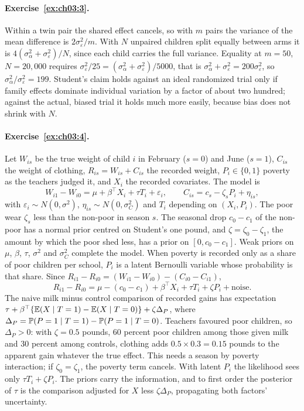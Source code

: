 \paragraph{Exercise~\ref{ex:ch03:3}.} Within a twin pair the shared effect cancels, so with $m$ pairs the variance of the mean difference is $2\sigma_\varepsilon^2/m$. With $N$ unpaired children split equally between arms it is $4(\sigma_\alpha^2 + \sigma_\varepsilon^2)/N$, since each child carries the full variance. Equality at $m = 50$, $N = 20{,}000$ requires $\sigma_\varepsilon^2/25 = (\sigma_\alpha^2 + \sigma_\varepsilon^2)/5000$, that is $\sigma_\alpha^2 + \sigma_\varepsilon^2 = 200\sigma_\varepsilon^2$, so $\sigma_\alpha^2/\sigma_\varepsilon^2 = 199$. Student's claim holds against an ideal randomized trial only if family effects dominate individual variation by a factor of about two hundred; against the actual, biased trial it holds much more easily, because bias does not shrink with $N$.

\paragraph{Exercise~\ref{ex:ch03:4}.} Let $W_{is}$ be the true weight of child $i$ in February ($s = 0$) and June ($s = 1$), $C_{is}$ the weight of clothing, $R_{is} = W_{is} + C_{is}$ the recorded weight, $P_i \in \{0, 1\}$ poverty as the teachers judged it, and $X_i$ the recorded covariates. The model is
\[
W_{i1} - W_{i0} = \mu + \beta^\top X_i + \tau T_i + \varepsilon_i, \qquad C_{is} = c_s - \zeta_s P_i + \eta_{is},
\]
with $\varepsilon_i \sim N(0, \sigma^2)$, $\eta_{is} \sim N(0, \sigma_C^2)$ and $T_i$ depending on $(X_i, P_i)$. The poor wear $\zeta_s$ less than the non-poor in season $s$. The seasonal drop $c_0 - c_1$ of the non-poor has a normal prior centred on Student's one pound, and $\zeta = \zeta_0 - \zeta_1$, the amount by which the poor shed less, has a prior on $[0, c_0 - c_1]$. Weak priors on $\mu$, $\beta$, $\tau$, $\sigma^2$ and $\sigma_C^2$ complete the model. When poverty is recorded only as a share of poor children per school, $P_i$ is a latent Bernoulli variable whose probability is that share. Since $R_{i1} - R_{i0} = (W_{i1} - W_{i0}) - (C_{i0} - C_{i1})$,
\[
R_{i1} - R_{i0} = \mu - (c_0 - c_1) + \beta^\top X_i + \tau T_i + \zeta P_i + \text{noise}.
\]
The naive milk minus control comparison of recorded gains has expectation $\tau+\beta^\top\{\mathbb{E}(X\mid T=1)-\mathbb{E}(X\mid T=0)\}+\zeta\Delta_P$, where $\Delta_P=\mathbb{P}(P=1\mid T=1)-\mathbb{P}(P=1\mid T=0)$. Teachers favoured poor children, so $\Delta_P>0$: with $\zeta=0.5$ pounds, 60 percent poor children among those given milk and 30 percent among controls, clothing adds $0.5\times0.3=0.15$ pounds to the apparent gain whatever the true effect. This needs a season by poverty interaction; if $\zeta_0=\zeta_1$, the poverty term cancels. With latent $P_i$ the likelihood sees only $\tau T_i+\zeta P_i$. The priors carry the information, and to first order the posterior of $\tau$ is the comparison adjusted for $X$ less $\zeta\Delta_P$, propagating both factors' uncertainty.

